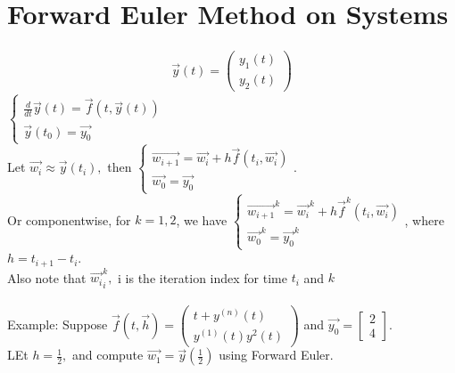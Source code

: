 \documentclass[11pt,oneside]{book}
\theoremstyle{break}
\theoremstyle{break}
\newcommand{\example}{\color{purple}Example: \color{black}}
\begin{document}
 \section[Forward Euler Method on Systems]{Forward Euler Method on Systems}
 \begin{align*}
 \vec{y}(t)=\begin{pmatrix}
 y_1(t)\\
 y_2(t)
 \end{pmatrix}
 \end{align*}
$ \begin{cases}
 \frac{d}{dt}\vec{y}(t)=\vec{f}(t,\vec{y}(t))\\
 \vec{y}(t_0)=\vec{y_0}
 \end{cases}$\\
 Let $\vec{w_i}\approx \vec{y}(t_i),$ then $\begin{cases}
 \vec{w_{i+1}}=\vec{w_i}+h\vec{f}(t_i,\vec{w_i})\\
 \vec{w_0}=\vec{y_0}
 \end{cases}$.\\
  Or componentwise, for $k=1,2$, we have $\begin{cases}
 \vec{w_{i+1}}^k=\vec{w_i}^k+h\vec{f}^k(t_i,\vec{w_i})\\
 \vec{w_0}^k=\vec{y_0}^k
 \end{cases}$, where $h=t_{i+1}-t_i$.\\
 Also note that $\vec{w_i}^k_{i},$ i is the iteration index for time $t_i$ and $k$\\
 \hfill\\
 \example Suppose $\vec{f}(t,\vec{h})=\begin{pmatrix}
 t+y^{(n)}(t)\\
 y^{(1)}(t)y^{2}(t)
 \end{pmatrix}
 $ and $\vec{y_0}=\begin{bmatrix}
 2\\
 4
 \end{bmatrix}$. \\
 LEt $h=\frac{1}{2},$ and compute $\vec{w_1}=\vec{y}\left(\frac{1}{2} \right)$ using Forward Euler.\\
\end{document}
